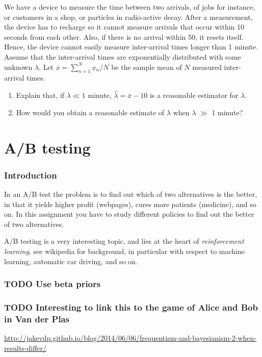 \documentclass[a4paper]{article}
\theoremstyle{definition}
\newcommand{\1}[1]{\,I_{#1}} %
\begin{document}
We have a device to measure the time between two arrivals, of jobs for instance, or customers in a shop, or particles in radio-active decay.
After a measurement, the device has to recharge so it cannot measure arrivals that occur within 10 seconds from each other.
Also, if there is no arrival within 50, it resets itself.
Hence, the device cannot easily measure inter-arrival times longer than 1 minute. Assume that the inter-arrival times are exponentially distributed with some unknown \(\lambda\). Let \(\bar x = \sum_{n=1}^N x_{n} /N\) be the sample mean of \(N\) measured inter-arrival times. 

\begin{enumerate}
\item Explain that, if \(\lambda \ll 1\) minute,  \(\hat \lambda = \bar x - 10\) is a reasonable estimator for \(\lambda\).
\item How would you obtain a reasonable estimate of \(\lambda\) when \(\lambda\) \(\gg\) 1 minute?
\end{enumerate}




\section{A/B testing}
\label{sec:org180b96a}
\subsubsection{Introduction}
\label{sec:org41a02a9}

In an A/B test the problem is to find out which of two alternatives is the better, in that it yields higher profit (webpages), cures more patients (medicine), and so on. In this assignment you have to study different policies to find out the better of two alternatives. 

A/B testing is a very interesting topic, and lies at the heart of \emph{reinforcement learning}, see wikipedia for background, in particular with respect to machine learning, automatic car driving, and so on. 


\subsubsection{{\bfseries\sffamily TODO} Use beta priors}
\label{sec:org9297a86}
\subsubsection{{\bfseries\sffamily TODO} Interesting to link this to the game of Alice and Bob in Van der Plas}
\label{sec:orgafbfbd0}
\url{http://jakevdp.github.io/blog/2014/06/06/frequentism-and-bayesianism-2-when-results-differ/}
\end{document}

